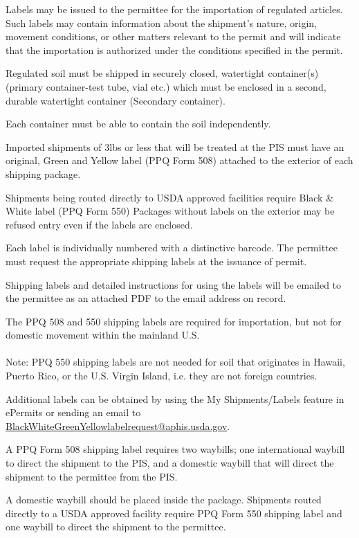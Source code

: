 \documentclass[12pt]{../SOP3}\usepackage[]{graphicx}\usepackage[]{color}
\begin{document}
\NP Labels may be issued to the permittee for the importation of regulated articles. Such labels may contain information about the shipment's nature, origin, movement conditions, or other matters relevant to the permit and will indicate that the importation is authorized under the conditions specified in the permit.

\NP Regulated soil must be shipped in securely closed, watertight container(s) (primary container-test tube, vial etc.) which must be enclosed in a second, durable watertight container (Secondary container). 

\NP Each container must be able to contain the soil independently. 

\NP Imported shipments of 3lbs or less that will be treated at the PIS must have an original, Green and Yellow label (PPQ Form 508) attached to the exterior of each shipping package. 

\NP Shipments being routed directly to USDA approved facilities require Black \& White label (PPQ Form 550) Packages without labels on the exterior may be refused entry even if the labels are enclosed. 

\NP Each label is individually numbered with a distinctive barcode. The permittee must request the appropriate shipping labels at the issuance of permit. 

\NP Shipping labels and detailed instructions for using the labels will be emailed to the permittee as an attached PDF to the email address on record. 

\NP The PPQ 508 and 550 shipping labels are required for importation, but not for domestic movement within the mainland U.S. 
\\
\\
\noindent Note: PPQ 550 shipping labels are not needed for soil that originates in Hawaii, Puerto Rico, or the U.S. Virgin Island, i.e. they are not foreign countries.

\NP Additional labels can be obtained by using the My Shipments/Labels feature in ePermits or sending an email to \url{BlackWhiteGreenYellowlabelrequest@aphis.usda.gov}.

\NP A PPQ Form 508 shipping label requires two waybills; one international waybill to direct the shipment to the PIS, and a domestic waybill that will direct the shipment to the permittee from the PIS. 

\NP A domestic waybill should be placed inside the package. Shipments routed directly to a USDA approved facility require PPQ Form 550 shipping label and one waybill to direct the shipment to the permittee. 
\end{document}
